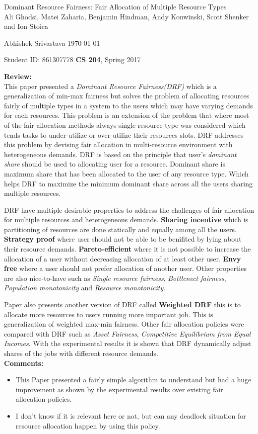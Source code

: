 \documentclass[a4paper,12pt, twoside]{article}
\renewcommand{\maketitle}{%
 	\Large
 	\begin{center}
 	Dominant Resource Fairness: Fair Allocation of Multiple Resource Types\\	
 	\normalsize Ali Ghodsi, Matei Zaharia, Benjamin Hindman, Andy Konwinski, Scott Shenker and Ion Stoica
 	\end{center}
 
 	\Large
	Abhishek Srivastava
	\hfill
	\normalsize
	\today
 	\par
 	Student ID: 861307778
 	\hfill
 	\textbf{CS 204}, Spring 2017
 	\par 	
 	\hrulefill
 	\par
 	}
\begin{document}
\thispagestyle{empty}
	
\maketitle

\textbf{Review:}\\

This paper presented a \emph{Dominant Resource Fairness(DRF)} which is a generalization of min-max fairness but solves the problem of allocating resources fairly of multiple types in a system to the users which may have varying demands for each resources. This problem is an extension of the problem that where most of the fair allocation methods always single resource type was considered which tends tasks to under-utilize or over-utilize their resources slots. DRF addresses this problem by devising fair allocation in multi-resource environment with heterogeneous demands. DRF is based on the principle that user's \emph{dominant share} should be used to allocating user for a resource. Dominant share is maximum share that has been allocated to the user of any resource type. Which helps DRF to maximize the minimum dominant share across all the users sharing multiple resources.

DRF have multiple desirable properties to address the challenges of fair allocation for multiple resources and heterogeneous demands. \textbf{Sharing incentive} which is partitioning of resources are done statically and equally among all the users. \textbf{Strategy proof} where user should not be able to  be benifited by lying about their resource demands. \textbf{Pareto-efficient} where it is not possible to increase the allocation of a user without decreasing allocation of at least other user. \textbf{Envy free} where a user should not prefer allocation of another user. Other properties are also nice-to-have such as \emph{Single resource fairness}, \emph{Bottlenect fairness}, \emph{Population monotonicity} and \emph{Resource monotonicity}.

Paper also presents another version of DRF called \textbf{Weighted DRF} this is to allocate more resources to users running more important job. This is generalization of weighted max-min fairness. Other fair allocation policies were compared with DRF such as \emph{Asset Fairness}, \emph{Competitive Equilibrium from Equal Incomes}. With the experimental results it is shown that DRF dynamically adjust shares of the jobs with different resource demands.\\

\textbf{Comments:}
\begin{itemize}
	\item This Paper presented a fairly simple algorithm to understand but had a huge improvement as shown by the experimental results over existing fair allocation policies.
	\item I don't know if it is relevant here or not, but can any deadlock situation for resource allocation happen by using this policy.   
\end{itemize}
\end{document}
